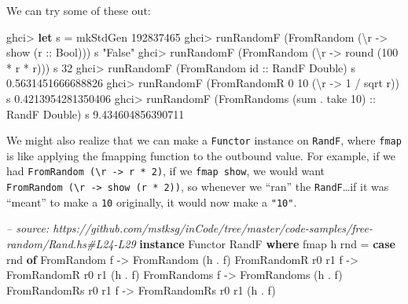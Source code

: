 \documentclass[]{article}
\newenvironment{Shaded}{}{}
\newcommand{\KeywordTok}[1]{\textcolor[rgb]{0.00,0.44,0.13}{\textbf{#1}}}
\newcommand{\DataTypeTok}[1]{\textcolor[rgb]{0.56,0.13,0.00}{#1}}
\newcommand{\DecValTok}[1]{\textcolor[rgb]{0.25,0.63,0.44}{#1}}
\newcommand{\FloatTok}[1]{\textcolor[rgb]{0.25,0.63,0.44}{#1}}
\newcommand{\StringTok}[1]{\textcolor[rgb]{0.25,0.44,0.63}{#1}}
\newcommand{\CommentTok}[1]{\textcolor[rgb]{0.38,0.63,0.69}{\textit{#1}}}
\newcommand{\OtherTok}[1]{\textcolor[rgb]{0.00,0.44,0.13}{#1}}
\newcommand{\FunctionTok}[1]{\textcolor[rgb]{0.02,0.16,0.49}{#1}}
\newcommand{\NormalTok}[1]{#1}
\begin{document}
We can try some of these out:

\begin{Shaded}
\begin{Highlighting}[]
\NormalTok{ghci}\FunctionTok{>} \KeywordTok{let}\NormalTok{ s }\FunctionTok{=}\NormalTok{ mkStdGen }\DecValTok{192837465}
\NormalTok{ghci}\FunctionTok{>}\NormalTok{ runRandomF (}\DataTypeTok{FromRandom}\NormalTok{ (\textbackslash{}r }\OtherTok{->}\NormalTok{ show (}\OtherTok{r ::} \DataTypeTok{Bool}\NormalTok{))) s}
\StringTok{"False"}
\NormalTok{ghci}\FunctionTok{>}\NormalTok{ runRandomF (}\DataTypeTok{FromRandom}\NormalTok{ (\textbackslash{}r }\OtherTok{->}\NormalTok{ round (}\DecValTok{100} \FunctionTok{*}\NormalTok{ r }\FunctionTok{*}\NormalTok{ r))) s}
\DecValTok{32}
\NormalTok{ghci}\FunctionTok{>}\NormalTok{ runRandomF (}\DataTypeTok{FromRandom}\OtherTok{ id ::} \DataTypeTok{RandF} \DataTypeTok{Double}\NormalTok{) s}
\FloatTok{0.5631451666688826}
\NormalTok{ghci}\FunctionTok{>}\NormalTok{ runRandomF (}\DataTypeTok{FromRandomR} \DecValTok{0} \DecValTok{10}\NormalTok{ (\textbackslash{}r }\OtherTok{->} \DecValTok{1} \FunctionTok{/}\NormalTok{ sqrt r)) s}
\FloatTok{0.4213954281350406}
\NormalTok{ghci}\FunctionTok{>}\NormalTok{ runRandomF (}\DataTypeTok{FromRandoms}\NormalTok{ (sum }\FunctionTok{.}\NormalTok{ take }\DecValTok{10}\NormalTok{)}\OtherTok{ ::} \DataTypeTok{RandF} \DataTypeTok{Double}\NormalTok{) s}
\FloatTok{9.434604856390711}
\end{Highlighting}
\end{Shaded}

We might also realize that we can make a \texttt{Functor} instance on
\texttt{RandF}, where \texttt{fmap} is like applying the fmapping function to
the outbound value. For example, if we had
\texttt{FromRandom\ (\textbackslash{}r\ -\textgreater{}\ r\ *\ 2)}, if we
\texttt{fmap\ show}, we would want
\texttt{FromRandom\ (\textbackslash{}r\ -\textgreater{}\ show\ (r\ *\ 2))}, so
whenever we ``ran'' the \texttt{RandF}\ldots{}if it was ``meant'' to make a
\texttt{10} originally, it would now make a \texttt{"10"}.

\begin{Shaded}
\begin{Highlighting}[]
\CommentTok{-- source: https://github.com/mstksg/inCode/tree/master/code-samples/free-random/Rand.hs#L24-L29}
\KeywordTok{instance} \DataTypeTok{Functor} \DataTypeTok{RandF} \KeywordTok{where}
\NormalTok{    fmap h rnd }\FunctionTok{=} \KeywordTok{case}\NormalTok{ rnd }\KeywordTok{of}
        \DataTypeTok{FromRandom}\NormalTok{         f }\OtherTok{->} \DataTypeTok{FromRandom}\NormalTok{         (h }\FunctionTok{.}\NormalTok{ f)}
        \DataTypeTok{FromRandomR}\NormalTok{ r0 r1  f }\OtherTok{->} \DataTypeTok{FromRandomR}\NormalTok{ r0 r1  (h }\FunctionTok{.}\NormalTok{ f)}
        \DataTypeTok{FromRandoms}\NormalTok{        f }\OtherTok{->} \DataTypeTok{FromRandoms}\NormalTok{        (h }\FunctionTok{.}\NormalTok{ f)}
        \DataTypeTok{FromRandomRs}\NormalTok{ r0 r1 f }\OtherTok{->} \DataTypeTok{FromRandomRs}\NormalTok{ r0 r1 (h }\FunctionTok{.}\NormalTok{ f)}
\end{Highlighting}
\end{Shaded}
\end{document}
